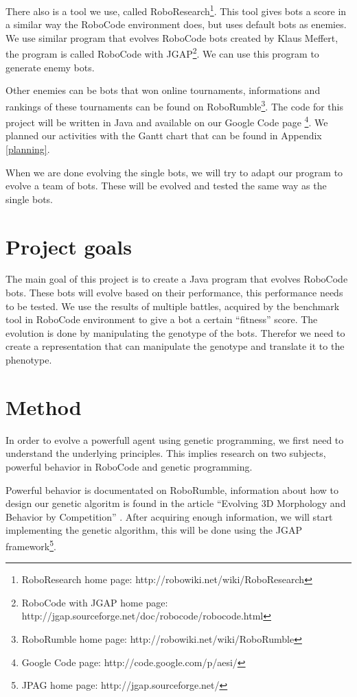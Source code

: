 \documentclass[a4paper,10pt]{article}
\begin{document}
There also is a tool we use, called RoboResearch\footnote{RoboResearch home page: http://robowiki.net/wiki/RoboResearch}. This tool gives bots a score in a similar way the RoboCode environment does, but uses default bots as enemies.
We use similar program that evolves RoboCode bots created by Klaus Meffert, the program is called RoboCode with JGAP\footnote{RoboCode with JGAP home page: http://jgap.sourceforge.net/doc/robocode/robocode.html}. We can use this program to generate enemy bots.

Other enemies can be bots that won online tournaments, informations and rankings of these tournaments can be found on RoboRumble\footnote{RoboRumble home page: http://robowiki.net/wiki/RoboRumble}.
The code for this project will be written in Java and available on our Google Code page \footnote{Google Code page: http://code.google.com/p/aesi/}.
We planned our activities with the Gantt chart that can be found in Appendix \ref{planning}.

When we are done evolving the single bots, we will try to adapt our program to evolve a team of bots. These will be evolved and tested the same way as the single bots.

\section{Project goals}
The main goal of this project is to create a Java program that evolves RoboCode bots.
These bots will evolve based on their performance, this performance needs to be tested. We use the results of multiple battles, acquired by the benchmark tool in RoboCode environment to give a bot a certain ``fitness'' score.
The evolution is done by manipulating the genotype of the bots. Therefor we need to create a representation that can manipulate the genotype and translate it to the phenotype.

\section{Method}
In order to evolve a powerfull agent using genetic programming, we first need to understand the underlying principles. This implies research on two subjects, powerful behavior in RoboCode and genetic programming.

Powerful behavior is documentated on RoboRumble, information about how to design our genetic algoritm is found in the article ``Evolving 3D Morphology and Behavior by Competition'' \cite{karlsims}.
After acquiring enough information, we will start implementing the genetic algorithm, this will be done using the JGAP framework\footnote{JPAG home page: http://jgap.sourceforge.net/}.
\end{document}
